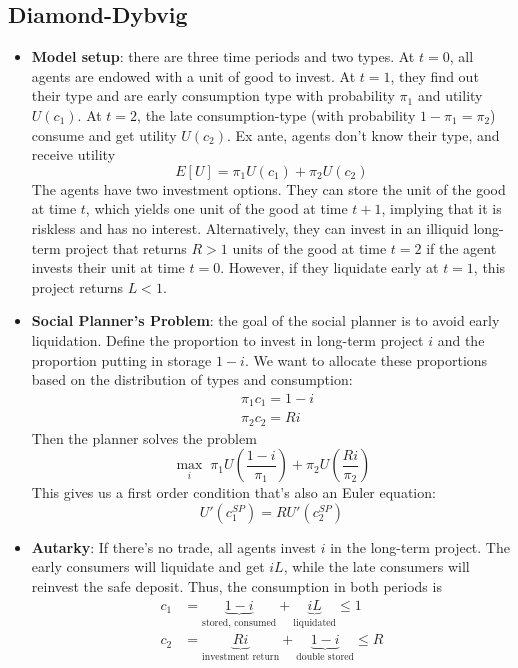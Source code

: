 \documentclass[12pt]{article}
\begin{document}
\subsection{Diamond-Dybvig}

\begin{itemize}
    \item \textbf{Model setup}: there are three time periods and two types. At $t=0$, all agents are endowed with a unit of good to invest. At $t=1$, they find out their type and are early consumption type with probability $\pi_1$ and utility $U(c_1)$. At $t=2$, the late consumption-type (with probability $1-\pi_1 = \pi_2$) consume and get utility $U(c_2)$. Ex ante, agents don't know their type, and receive utility
    \[E[U] = \pi_1U(c_1) + \pi_2U(c_2)\]
    The agents have two investment options. They can store the unit of the good at time $t$, which yields one unit of the good at time $t+1$, implying that it is riskless and has no interest. Alternatively, they can invest in an illiquid long-term project that returns $R>1$ units of the good at time $t=2$ if the agent invests their unit at time $t=0$. However, if they liquidate early at $t=1$, this project returns $L<1$. 
    \item \textbf{Social Planner's Problem}: the goal of the social planner is to avoid early liquidation. Define the proportion to invest in long-term project $i$ and the proportion putting in storage $1-i$. We want to allocate these proportions based on the distribution of types and consumption:
    \[\begin{split}
        &\pi_1c_1 = 1-i \\
        &\pi_2c_2 = Ri
    \end{split}\]
    Then the planner solves the problem
    \[\max_i\;\pi_1U\left(\frac{1-i}{\pi_1}\right) + \pi_2U\left(\frac{Ri}{\pi_2}\right)\]
    This gives us a first order condition that's also an Euler equation:
    \[U'(c_1^{SP}) = RU'(c_2^{SP})\]
    \item \textbf{Autarky}: If there's no trade, all agents invest $i$ in the long-term project. The early consumers will liquidate and get $iL$, while the late consumers will reinvest the safe deposit. Thus, the consumption in both periods is
    \[\begin{split}
        c_1 &= \underbrace{1-i}_{\text{stored, consumed}} + \underbrace{iL}_{\text{liquidated}} \leq 1 \\
        c_2 &= \underbrace{Ri}_{\text{investment return}} + \underbrace{1-i}_{\text{double stored}} \leq R
    \end{split}\]

\end{itemize}
\end{document}
